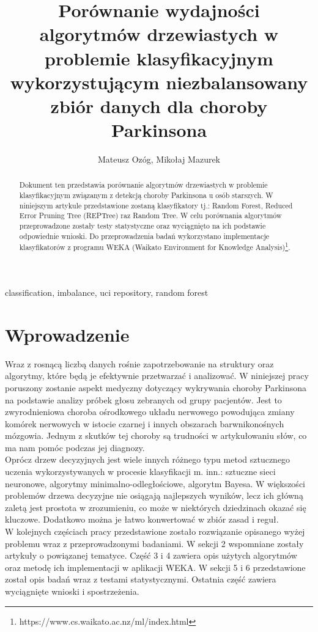 \documentclass[conference]{IEEEtran}
\begin{document}
\title{Porównanie wydajności algorytmów drzewiastych w problemie klasyfikacyjnym wykorzystującym niezbalansowany zbiór danych dla choroby Parkinsona}

\author{Mateusz Ozóg, Mikołaj Mazurek}

\maketitle

\begin{abstract}
Dokument ten przedstawia porównanie algorytmów drzewiastych w problemie klasyfikacyjnym związanym z detekcją choroby Parkinsona u osób starszych. W niniejszym artykule przedstawione zostaną klasyfikatory tj.: Random Forest, Reduced Error Pruning Tree (REPTree) raz Random Tree. W celu porównania algorytmów przeprowadzone zostały testy statystyczne oraz wyciągnięto na ich podstawie odpowiednie wnioski. Do przeprowadzenia badań wykorzystano implementacje klasyfikatorów z programu WEKA (Waikato Environment for Knowledge Analysis)\footnote{https://www.cs.waikato.ac.nz/ml/index.html}.
\end{abstract}

\begin{IEEEkeywords}
classification, imbalance, uci repository, random forest
\end{IEEEkeywords}

\section{Wprowadzenie}
Wraz z rosnącą liczbą danych rośnie zapotrzebowanie na struktury oraz algorytmy, które będą je efektywnie przetwarzać i analizować. W niniejszej pracy poruszony zostanie aspekt medyczny dotyczący wykrywania choroby Parkinsona na podstawie analizy próbek głosu zebranych od grupy pacjentów. Jest to zwyrodnieniowa choroba ośrodkowego układu nerwowego powodująca zmiany komórek nerwowych w istocie czarnej i innych obszarach barwnikonośnych mózgowia. Jednym z skutków tej choroby są trudności w artykułowaniu słów, co ma nam pomóc podczas jej diagnozy. \\
\indent Oprócz drzew decyzyjnych jest wiele innych różnego typu metod sztucznego uczenia wykorzystywanych w procesie klasyfikacji m. inn.: sztuczne sieci neuronowe, algorytmy minimalno-odległościowe, algorytm Bayesa. W większości problemów drzewa decyzyjne nie osiągają najlepszych wyników, lecz ich główną zaletą jest prostota w zrozumieniu, co może w niektórych dziedzinach okazać się kluczowe. Dodatkowo można je łatwo konwertować w zbiór zasad i reguł. \\
\indent W kolejnych częściach pracy przedstawione zostało rozwiązanie opisanego wyżej problemu wraz z przeprowadzonymi badaniami. W sekcji 2 wspomniane zostały artykuły o powiązanej tematyce. Część 3 i 4 zawiera opis użytych algorytmów oraz metodę ich implementacji w aplikacji WEKA. W sekcji 5 i 6 przedstawione został opis badań wraz z testami statystycznymi. Ostatnia część zawiera wyciągnięte wnioski i spostrzeżenia. 
\end{document}
